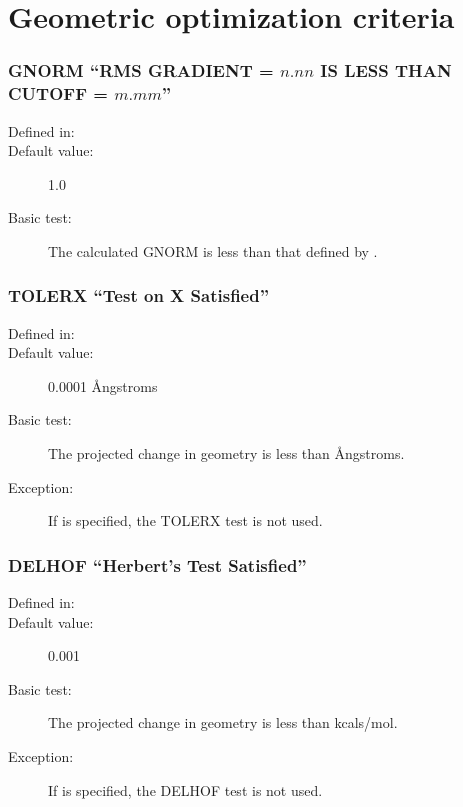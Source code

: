 \section{Geometric optimization criteria}
\subsubsection*{GNORM ``RMS GRADIENT =  $n.nn$  IS LESS THAN CUTOFF =  $m.mm$''}
\begin{description}
\item[Defined in:] 
\item[Default value:] 1.0
\item[Basic test:] The calculated GNORM is less than that defined by .    \\
\end{description}

\subsubsection*{TOLERX ``Test on X Satisfied''}
\begin{description}
\item[Defined in:] 
\item[Default value:] 0.0001 \AA ngstroms
\item[Basic test:] The projected change in geometry is less than  \AA ngstroms.
\item[Exception:] If  is specified, the TOLERX test is not used.
\end{description}

\subsubsection*{DELHOF ``Herbert's Test Satisfied''}
\begin{description}
\item[Defined in:] 
\item[Default value:] 0.001
\item[Basic test:] The projected change in geometry is less than  kcals/mol.
\item[Exception:] If  is specified, the DELHOF test is not used.
\end{description}

